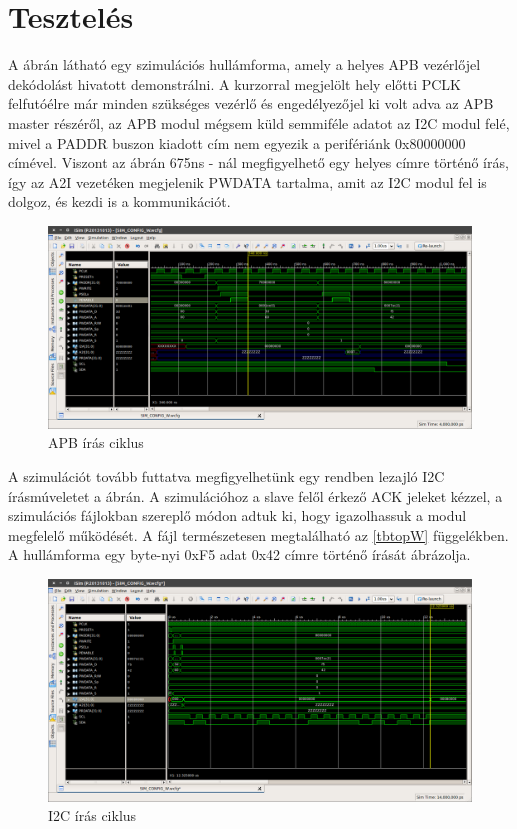 \chapter{Tesztelés}
\label{sec:testing}

A  ábrán látható egy szimulációs hullámforma, amely a helyes APB vezérlőjel dekódolást hivatott demonstrálni. A kurzorral megjelölt hely előtti PCLK felfutóélre már minden szükséges vezérlő és engedélyezőjel ki volt adva az APB master részéről, az APB modul mégsem küld semmiféle adatot az I2C modul felé, mivel a PADDR buszon kiadott cím nem egyezik a perifériánk 0x80000000 címével. Viszont az ábrán 675ns - nál megfigyelhető egy helyes címre történő írás, így az A2I vezetéken megjelenik PWDATA tartalma, amit az I2C modul fel is dolgoz, és kezdi is a kommunikációt.
\begin{figure}[ht!]
    \includegraphics[width=\textwidth]{figures/APB_invalidwrite.png}
    \caption{APB írás ciklus}
    \label{fig:APBwrite}
\end{figure}

A szimulációt tovább futtatva megfigyelhetünk egy rendben lezajló I2C írásmúveletet a  ábrán. A szimulációhoz a slave felől érkező ACK jeleket kézzel, a szimulációs fájlokban szereplő módon adtuk ki, hogy igazolhassuk a modul megfelelő működését. A fájl természetesen megtalálható az \ref{tbtopW} függelékben.
A hullámforma egy byte-nyi 0xF5 adat 0x42 címre történő írását ábrázolja.
\begin{figure}[ht!]
    \includegraphics[width=\textwidth]{figures/I2C_W2.png}
    \caption{I2C írás ciklus}
    \label{fig:I2Cwrite}
\end{figure}


